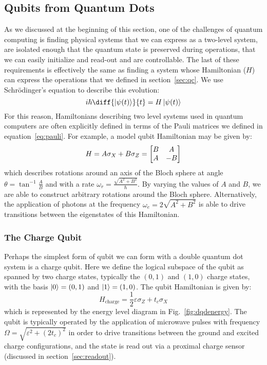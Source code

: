\subsection{Qubits from Quantum Dots}
As we discussed at the beginning of this section, one of the challenges of quantum computing is finding physical systems
that we can express as a two-level system, are isolated enough that the quantum state is preserved during operations,
that we can easily initialize and read-out and are controllable. The last of these requirements is effectively the
same as finding a system whose Hamiltonian ($H$) can express the operations that we defined in section~\ref{sec:qc}. We use
Schr\"odinger's equation to describe this evolution:
\begin{equation}
  i \hbar \diff{\ket{\psi(t)}}{t} = H \ket{\psi(t)}
\end{equation}
For this reason, Hamiltonians describing two level systems used in quantum computers are often explicitly defined in terms of
the Pauli matrices we defined in equation~\ref{eq:pauli}. For example, a model qubit Hamiltonian may be given by:
\begin{equation}
  H = A \sigma_X + B \sigma_Z = \begin{bmatrix}B&A\\A&-B\end{bmatrix}
\end{equation}
which describes rotations around an axis of the Bloch sphere at angle $\theta = \tan^{-1}\tfrac{A}{B}$ and with a rate
$\omega_r = \tfrac{\sqrt{A^2 + B^2}}{\hbar}$. By varying the values of $A$ and $B$, we are able to construct arbitrary
rotations around the Bloch sphere. Alternatively, the application of photons at the frequency
$\omega_e = 2\sqrt{A^2 + B^2}$ is able to drive transitions between the eigenstates of this Hamiltonian.

\subsubsection{The Charge Qubit}
Perhaps the simplest form of qubit we can form with a double quantum dot system is a charge qubit. Here we define
the logical subspace of the qubit as spanned by two charge states, typically the $(0, 1)$ and $(1, 0)$ charge states,
with the basis $\ket{0} = (0, 1)$ and $\ket{1} = (1, 0)$. The qubit Hamiltonian is given by:
\begin{equation}
  H_{\textrm{charge}} = \frac{1}{2}\varepsilon\sigma_Z + t_c\sigma_X
\end{equation}
which is represented by the energy level diagram in Fig.~\ref{fig:dqdenergy}. The qubit is typically operated by the application
of microwave pulses with frequency $\Omega = \sqrt{\varepsilon^2 + (2 t_c)^2}$ in order to drive transitions between the ground and
excited charge configurations, and the state is read out via a proximal charge sensor (discussed in section~\ref{sec:readout}).

